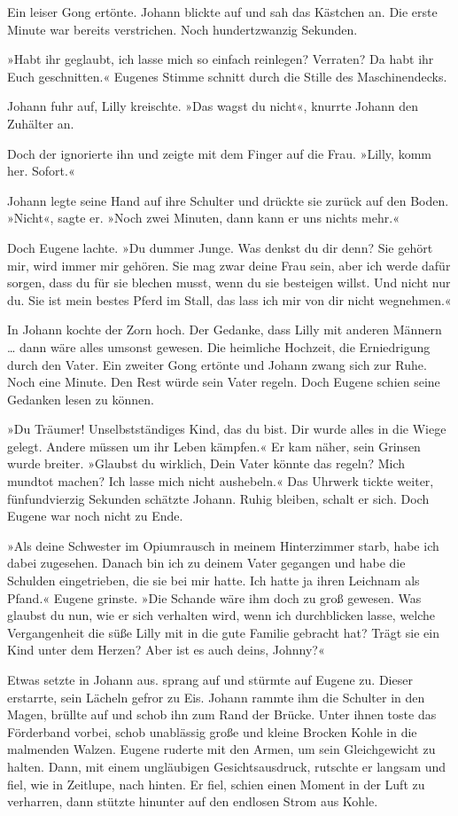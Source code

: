 Ein leiser Gong ertönte. Johann blickte auf und sah das Kästchen
an. Die erste Minute war bereits verstrichen. Noch hundertzwanzig
Sekunden.

»Habt ihr geglaubt, ich lasse mich so einfach reinlegen? Verraten?
Da habt ihr Euch geschnitten.« Eugenes Stimme schnitt durch die
Stille des Maschinendecks.

Johann fuhr auf, Lilly kreischte. »Das wagst du nicht«, knurrte
Johann den Zuhälter an.

Doch der ignorierte ihn und zeigte mit dem Finger auf die Frau.
»Lilly, komm her. Sofort.«

Johann legte seine Hand auf ihre Schulter und drückte sie zurück
auf den Boden. »Nicht«, sagte er. »Noch zwei Minuten, dann kann er
uns nichts mehr.«

Doch Eugene lachte. »Du dummer Junge. Was denkst du dir denn? Sie
gehört mir, wird immer mir gehören. Sie mag zwar deine Frau sein,
aber ich werde dafür sorgen, dass du für sie blechen musst, wenn du
sie besteigen willst. Und nicht nur du. Sie ist mein bestes Pferd
im Stall, das lass ich mir von dir nicht wegnehmen.«

In Johann kochte der Zorn hoch. Der Gedanke, dass Lilly mit anderen
Männern \ldots{} dann wäre alles umsonst gewesen. Die heimliche
Hochzeit, die Erniedrigung durch den Vater. Ein zweiter Gong
ertönte und Johann zwang sich zur Ruhe. Noch eine Minute. Den Rest
würde sein Vater regeln. Doch Eugene schien seine Gedanken lesen zu
können.

»Du Träumer! Unselbstständiges Kind, das du bist. Dir wurde alles
in die Wiege gelegt. Andere müssen um ihr Leben kämpfen.« Er kam
näher, sein Grinsen wurde breiter. »Glaubst du wirklich, Dein Vater
könnte das regeln? Mich mundtot machen? Ich lasse mich nicht
aushebeln.« Das Uhrwerk tickte weiter, fünfundvierzig Sekunden
schätzte Johann. Ruhig bleiben, schalt er sich. Doch Eugene war
noch nicht zu Ende.

»Als deine Schwester im Opiumrausch in meinem Hinterzimmer starb,
habe ich dabei zugesehen. Danach bin ich zu deinem Vater gegangen
und habe die Schulden eingetrieben, die sie bei mir hatte. Ich
hatte ja ihren Leichnam als Pfand.« Eugene grinste. »Die Schande
wäre ihm doch zu groß gewesen. Was glaubst du nun, wie er sich
verhalten wird, wenn ich durchblicken lasse, welche Vergangenheit
die süße Lilly mit in die gute Familie gebracht hat? Trägt sie ein
Kind unter dem Herzen? Aber ist es auch deins, Johnny?«

Etwas setzte in Johann aus. sprang auf und stürmte auf Eugene zu.
Dieser erstarrte, sein Lächeln gefror zu Eis. Johann rammte ihm die
Schulter in den Magen, brüllte auf und schob ihn zum Rand der
Brücke. Unter ihnen toste das Förderband vorbei, schob unablässig
große und kleine Brocken Kohle in die malmenden Walzen. Eugene
ruderte mit den Armen, um sein Gleichgewicht zu halten. Dann, mit
einem ungläubigen Gesichtsausdruck, rutschte er langsam und fiel,
wie in Zeitlupe, nach hinten. Er fiel, schien einen Moment in der
Luft zu verharren, dann stützte hinunter auf den endlosen Strom aus
Kohle.

